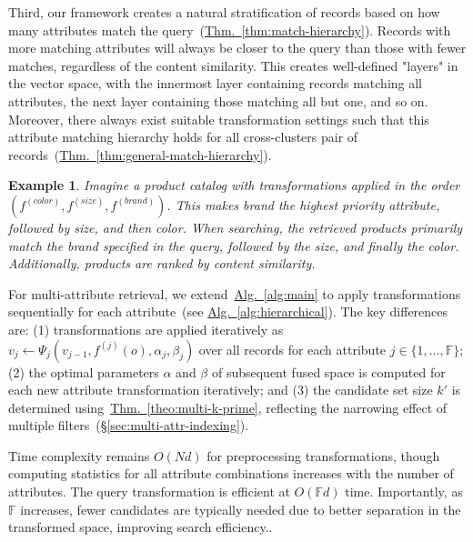 \documentclass[numbers,sort]{article}
\newtheorem{example}{Example}
\begin{document}
Third, our framework creates a natural stratification of records based on how many attributes match the query~(\hyperref[thm:match-hierarchy]{Thm.~\ref*{thm:match-hierarchy}}). Records with more matching attributes will always be closer to the query than those with fewer matches, regardless of the content similarity. This creates well-defined "layers" in the vector space, with the innermost layer containing records matching all attributes, the next layer containing those matching all but one, and so on. Moreover, there always exist suitable transformation settings such that this attribute matching hierarchy holds for all cross-clusters pair of records~(\hyperref[thm:general-match-hierarchy]{Thm.~\ref*{thm:general-match-hierarchy}}).
\begin{example}
Imagine a product catalog with transformations applied in the order $(f^{(color)}, f^{(size)}, f^{(brand)})$. This makes brand the highest priority attribute, followed by size, and then color. When searching, the retrieved products primarily match the brand specified in the query, followed by the size, and finally the color. Additionally, products are ranked by content similarity.
\end{example}
For multi-attribute retrieval, we extend~\hyperref[alg:main]{Alg.~\ref*{alg:main}} to apply transformations sequentially for each attribute~(see \hyperref[alg:hierarchical]{Alg.~\ref*{alg:hierarchical}}). The key differences are: (1) transformations are applied iteratively as $v_j \gets \Psi_j(v_{j-1}, f^{(j)}(o), \alpha_j, \beta_j)$ over all records for each attribute $j \in \{1,\ldots,\mathbb{F}\}$; (2) the optimal parameters $\alpha$ and $\beta$ of subsequent fused space is computed for each new attribute transformation iteratively; and (3) the candidate set size $k'$ is determined using~\hyperref[theo:multi-k-prime]{Thm.~\ref*{theo:multi-k-prime}}, reflecting the narrowing effect of multiple filters~(\hyperref[sec:multi-attr-indexing]{\S\ref*{sec:multi-attr-indexing}}).

Time complexity remains $O(Nd)$ for preprocessing transformations, though computing statistics for all attribute combinations increases with the number of attributes. The query transformation is efficient at $O(\mathbb{F}d)$ time. Importantly, as $\mathbb{F}$ increases, fewer candidates are typically needed due to better separation in the transformed space, improving search efficiency..
\end{document}
